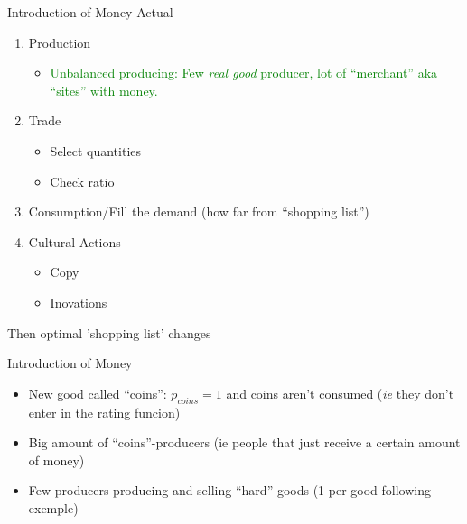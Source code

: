 \documentclass[12pt, notes=show]{beamer}
\begin{document}
\begin{frame}{Introduction of Money}
    Actual 
    \begin{enumerate}
	\item Production
	    \begin{itemize}
		\item <3->\textcolor{green}{Unbalanced producing: Few \emph{real good} producer, lot of ``merchant'' aka ``sites'' with money.}
	    \end{itemize}
	\item Trade
	    \begin{itemize}
		\item Select quantities \uncover<4->{\textcolor{green}{\tiny / Requested quantites depends on production}}
		\item Check ratio 
	    \end{itemize}
	\item Consumption/Fill the demand (how far from ``shopping list'')\uncover<5->{\textcolor{green}{\tiny / money is not ``consume'' \dots}}
	\item Cultural Actions \uncover<6->{\textcolor{green}{\tiny  /a priori nothing, but\dots}}
	    \begin{itemize}
		\item Copy 
		\item Inovations \uncover<7->{\textcolor{green}{\tiny / should 'value' of price evolve?}}
	    \end{itemize}
    \end{enumerate}
    
\end{frame}

\begin{frame}{}

    Then optimal 'shopping list' changes


\end{frame}
\begin{frame}{Introduction of Money}
    \begin{itemize}
	\item New good called ``coins'': $p_{coins}=1$ and coins aren't consumed (\emph{ie} they don't enter in the rating funcion)
	\item Big amount of ``coins''-producers (ie people that just receive a certain amount of money)
	\item Few producers producing and selling ``hard'' goods (1 per good following exemple)
    \end{itemize}
\end{frame}
\end{document}
